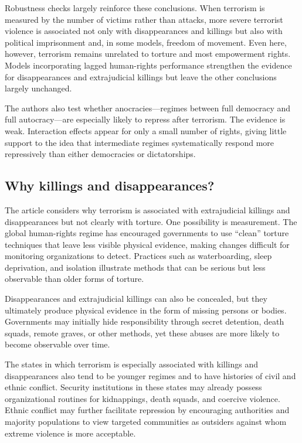 Robustness checks largely reinforce these conclusions. When terrorism is measured by the number of victims rather than attacks, more severe terrorist violence is associated not only with disappearances and killings but also with political imprisonment and, in some models, freedom of movement. Even here, however, terrorism remains unrelated to torture and most empowerment rights. Models incorporating lagged human-rights performance strengthen the evidence for disappearances and extrajudicial killings but leave the other conclusions largely unchanged.

The authors also test whether anocracies---regimes between full democracy and full autocracy---are especially likely to repress after terrorism. The evidence is weak. Interaction effects appear for only a small number of rights, giving little support to the idea that intermediate regimes systematically respond more repressively than either democracies or dictatorships.

\subsection{Why killings and disappearances?}

The article considers why terrorism is associated with extrajudicial killings and disappearances but not clearly with torture. One possibility is measurement. The global human-rights regime has encouraged governments to use ``clean'' torture techniques that leave less visible physical evidence, making changes difficult for monitoring organizations to detect. Practices such as waterboarding, sleep deprivation, and isolation illustrate methods that can be serious but less observable than older forms of torture.

Disappearances and extrajudicial killings can also be concealed, but they ultimately produce physical evidence in the form of missing persons or bodies. Governments may initially hide responsibility through secret detention, death squads, remote graves, or other methods, yet these abuses are more likely to become observable over time.

The states in which terrorism is especially associated with killings and disappearances also tend to be younger regimes and to have histories of civil and ethnic conflict. Security institutions in these states may already possess organizational routines for kidnappings, death squads, and coercive violence. Ethnic conflict may further facilitate repression by encouraging authorities and majority populations to view targeted communities as outsiders against whom extreme violence is more acceptable.

